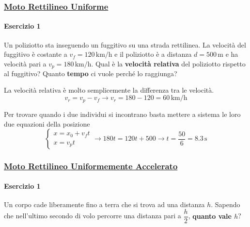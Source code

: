 \subsubsection*{\hyperref[subsec:cinematica:mru]{Moto Rettilineo Uniforme}}\label{ex:mru}
\paragraph{Esercizio 1}
Un poliziotto sta inseguendo un fuggitivo su una strada rettilinea. La velocità del fuggitivo è 
costante a $v_f = 120\,\text{km/h}$ e il poliziotto è a distanza $d=500\,\text{m}$ e ha velocità
pari a $v_p = 180\,\text{km/h}$. Qual è la \textbf{velocità relativa} del poliziotto rispetto al
fuggitivo? Quanto \textbf{tempo} ci vuole perché lo raggiunga?

\divisor

La velocità relativa è molto semplicemente la differenza tra le velocità.
\begin{equation*}
v_r = v_p-v_f \rightarrow v_r = 180-120 = \boxed{60\,\text{km/h}}
\end{equation*}

Per trovare quando i due individui si incontrano basta mettere a sistema le loro due equazioni
della posizione
\begin{equation*}
\begin{cases}
x = x_0 + v_ft\\x = v_pt
\end{cases}\rightarrow
180t = 120t + 500 \rightarrow t = \frac{50}{6} = \boxed{8.3\,\text{s}}
\end{equation*}

\subsubsection*{\hyperref[subsec:cinematica:mrua]{Moto Rettilineo Uniformemente Accelerato}}
\label{ex:mrua}

\paragraph{Esercizio 1}
Un corpo cade liberamente fino a terra che si trova ad una distanza $h$. Sapendo che nell'ultimo 
secondo di volo percorre una distanza pari a $\dfrac{h}{2}$, \textbf{quanto vale $h$}?

\divisor

